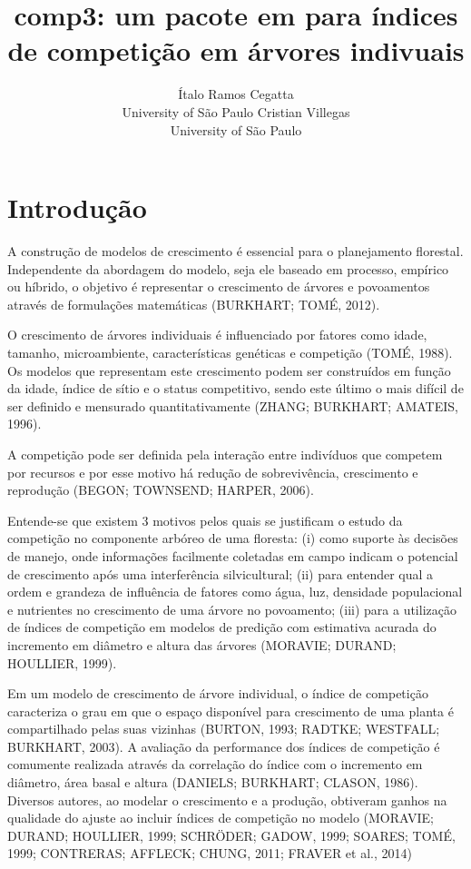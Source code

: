 \documentclass[article]{jss}
\author{
Ítalo Ramos Cegatta\\University of São Paulo \And Cristian Villegas\\University of São Paulo
}
\title{comp3: um pacote em \proglang{R} para índices de competição em árvores
indivuais}
\begin{document}
\section{Introdução}\label{introducao}

A construção de modelos de crescimento é essencial para o planejamento
florestal. Independente da abordagem do modelo, seja ele baseado em
processo, empírico ou híbrido, o objetivo é representar o crescimento de
árvores e povoamentos através de formulações matemáticas (BURKHART;
TOMÉ, 2012).

O crescimento de árvores individuais é influenciado por fatores como
idade, tamanho, microambiente, características genéticas e competição
(TOMÉ, 1988). Os modelos que representam este crescimento podem ser
construídos em função da idade, índice de sítio e o status competitivo,
sendo este último o mais difícil de ser definido e mensurado
quantitativamente (ZHANG; BURKHART; AMATEIS, 1996).

A competição pode ser definida pela interação entre indivíduos que
competem por recursos e por esse motivo há redução de sobrevivência,
crescimento e reprodução (BEGON; TOWNSEND; HARPER, 2006).

Entende-se que existem 3 motivos pelos quais se justificam o estudo da
competição no componente arbóreo de uma floresta: (i) como suporte às
decisões de manejo, onde informações facilmente coletadas em campo
indicam o potencial de crescimento após uma interferência silvicultural;
(ii) para entender qual a ordem e grandeza de influência de fatores como
água, luz, densidade populacional e nutrientes no crescimento de uma
árvore no povoamento; (iii) para a utilização de índices de competição
em modelos de predição com estimativa acurada do incremento em diâmetro
e altura das árvores (MORAVIE; DURAND; HOULLIER, 1999).

Em um modelo de crescimento de árvore individual, o índice de competição
caracteriza o grau em que o espaço disponível para crescimento de uma
planta é compartilhado pelas suas vizinhas (BURTON, 1993; RADTKE;
WESTFALL; BURKHART, 2003). A avaliação da performance dos índices de
competição é comumente realizada através da correlação do índice com o
incremento em diâmetro, área basal e altura (DANIELS; BURKHART; CLASON,
1986). Diversos autores, ao modelar o crescimento e a produção,
obtiveram ganhos na qualidade do ajuste ao incluir índices de competição
no modelo (MORAVIE; DURAND; HOULLIER, 1999; SCHRÖDER; GADOW, 1999;
SOARES; TOMÉ, 1999; CONTRERAS; AFFLECK; CHUNG, 2011; FRAVER et al.,
2014)
\end{document}
